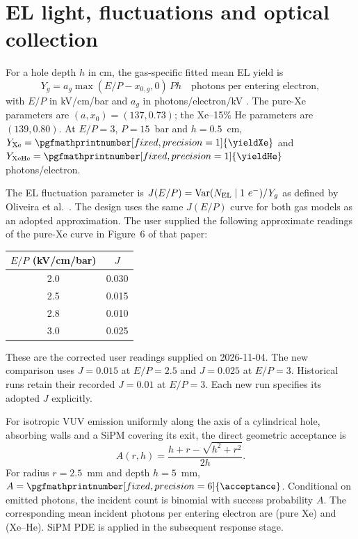 \documentclass[11pt]{article}
\newcommand{\PressureBar}{15}
\newcommand{\ELReducedField}{3}
\newcommand{\ELDepthCM}{0.5}
\newcommand{\HoleRadiusMM}{2.5}
\newcommand{\HoleDepthMM}{5}
\begin{document}
\section{EL light, fluctuations and optical collection}
For a hole depth $h$ in cm, the gas-specific fitted mean EL yield is
\begin{equation}
 Y_g=a_g\max(E/P-x_{0,g},0)\,P h
 \quad\text{photons per entering electron},
\end{equation}
with $E/P$ in kV/cm/bar and $a_g$ in photons/electron/kV
\cite[table~1]{NEXT:2019oxh}. The pure-Xe parameters are $(a,x_0)=(137,0.73)$;
the Xe--15\% He parameters are $(139,0.80)$. At
$E/P=\ELReducedField$, $P=\PressureBar$~bar and $h=\ELDepthCM$~cm,
$Y_{\rm Xe}=\pgfmathprintnumber[fixed,precision=1]{\yieldXe}$ and
$Y_{\rm XeHe}=\pgfmathprintnumber[fixed,precision=1]{\yieldHe}$ photons/electron.

The EL fluctuation parameter is
$J(E/P)=\mathrm{Var}(N_{\rm EL}\mid1\ e^-)/Y_g$ as defined by Oliveira
et al.\ \cite[eq.\ (4.6)]{Oliveira:2011xk}. The design uses the same $J(E/P)$ curve for
both gas models as an adopted approximation. The user supplied the following
approximate readings of the pure-Xe curve in Figure~6 of that paper:
\begin{center}
\begin{tabular}{cc}\toprule
$E/P$ (kV/cm/bar) & $J$\\\midrule
2.0 & 0.030\\
2.5 & 0.015\\
2.8 & 0.010\\
3.0 & 0.025\\
\bottomrule\end{tabular}
\end{center}
These are the corrected user readings supplied on 2026-11-04. The new
comparison uses $J=0.015$ at $E/P=2.5$ and $J=0.025$ at $E/P=3$.
Historical runs retain their recorded $J=0.01$ at $E/P=3$. Each new run
specifies its adopted $J$ explicitly.

For isotropic VUV emission uniformly along the axis of a cylindrical hole,
absorbing walls and a SiPM covering its exit, the direct geometric acceptance
is
\begin{equation}
 A(r,h)=\frac{h+r-\sqrt{h^2+r^2}}{2h}.
\end{equation}
For radius $r=\HoleRadiusMM$~mm and depth $h=\HoleDepthMM$~mm,
$A=\pgfmathprintnumber[fixed,precision=6]{\acceptance}$. Conditional on
emitted photons, the incident count is binomial with success probability $A$.
The corresponding mean incident photons per entering electron are
\pgfmathprintnumber[fixed,precision=1]{\incidentXe} (pure Xe) and
\pgfmathprintnumber[fixed,precision=1]{\incidentHe} (Xe--He). SiPM PDE is
applied in the subsequent response stage.
\end{document}
